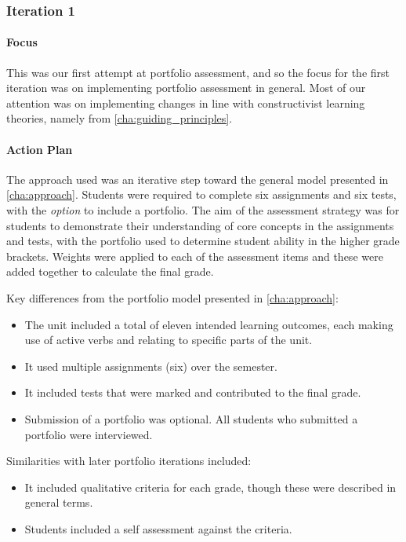 \subsubsection{Iteration 1} %
\label{sub:iteration_1}

\paragraph{Focus} %

This was our first attempt at portfolio assessment, and so the focus for the first iteration was on implementing portfolio assessment in general. Most of our attention was on implementing changes in line with constructivist learning theories, namely  from \cref{cha:guiding_principles}.

\paragraph{Action Plan} %

The approach used was an iterative step toward the general model presented in \cref{cha:approach}. Students were required to complete six assignments and six tests, with the \emph{option} to include a portfolio. The aim of the assessment strategy was for students to demonstrate their understanding of core concepts in the assignments and tests, with the portfolio used to determine student ability in the higher grade brackets. Weights were applied to each of the assessment items and these were added together to calculate the final grade.

Key differences from the portfolio model presented in \cref{cha:approach}:
\begin{itemize}[noitemsep,nolistsep]
  \item The unit included a total of eleven intended learning outcomes, each making use of active verbs and relating to specific parts of the unit.
  \item It used multiple assignments (six) over the semester.
  \item It included tests that were marked and contributed to the final grade.
  \item Submission of a portfolio was optional.  All students who submitted a portfolio were interviewed.
\end{itemize}

Similarities with later portfolio iterations included:
\begin{itemize}[noitemsep,nolistsep]
  \item It included qualitative criteria for each grade, though these were described in general terms.
  \item Students included a self assessment against the criteria.
\end{itemize}

